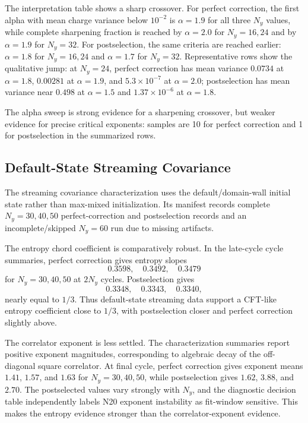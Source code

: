 \documentclass[aps,prb,onecolumn,nofootinbib,superscriptaddress]{revtex4-2}
\begin{document}
The interpretation table shows a sharp crossover.  For perfect correction, the first alpha with mean charge variance below $10^{-2}$ is $\alpha=1.9$ for all three $N_y$ values, while complete sharpening fraction is reached by $\alpha=2.0$ for $N_y=16,24$ and by $\alpha=1.9$ for $N_y=32$.  For postselection, the same criteria are reached earlier: $\alpha=1.8$ for $N_y=16,24$ and $\alpha=1.7$ for $N_y=32$.  Representative rows show the qualitative jump: at $N_y=24$, perfect correction has mean variance $0.0734$ at $\alpha=1.8$, $0.00281$ at $\alpha=1.9$, and $5.3\times10^{-7}$ at $\alpha=2.0$; postselection has mean variance near $0.498$ at $\alpha=1.5$ and $1.37\times10^{-6}$ at $\alpha=1.8$.

The alpha sweep is strong evidence for a sharpening crossover, but weaker evidence for precise critical exponents: samples are 10 for perfect correction and 1 for postselection in the summarized rows.

\subsection{Default-State Streaming Covariance}

The streaming covariance characterization uses the default/domain-wall initial state rather than max-mixed initialization.  Its manifest records complete $N_y=30,40,50$ perfect-correction and postselection records and an incomplete/skipped $N_y=60$ run due to missing artifacts.

The entropy chord coefficient is comparatively robust.  In the late-cycle cycle summaries, perfect correction gives entropy slopes
\[
0.3598,\quad 0.3492,\quad 0.3479
\]
for $N_y=30,40,50$ at $2N_y$ cycles.  Postselection gives
\[
0.3348,\quad 0.3343,\quad 0.3340,
\]
nearly equal to $1/3$.  Thus default-state streaming data support a CFT-like entropy coefficient close to $1/3$, with postselection closer and perfect correction slightly above.

The correlator exponent is less settled.  The characterization summaries report positive exponent magnitudes, corresponding to algebraic decay of the off-diagonal square correlator.  At final cycle, perfect correction gives exponent means $1.41$, $1.57$, and $1.63$ for $N_y=30,40,50$, while postselection gives $1.62$, $3.88$, and $2.70$.  The postselected values vary strongly with $N_y$, and the diagnostic decision table independently labels N20 exponent instability as fit-window sensitive.  This makes the entropy evidence stronger than the correlator-exponent evidence.
\end{document}
